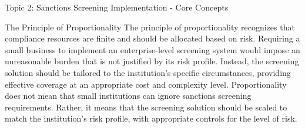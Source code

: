 \documentclass[5pt]{beamer}
\begin{document}
\begin{frame}{Topic 2: Sanctions Screening Implementation - Core Concepts}
\begin{block}{\tiny The Principle of Proportionality}
			The principle of proportionality recognizes that compliance resources are finite and should be allocated based on risk. Requiring a small business to implement an enterprise-level screening system would impose an unreasonable burden that is not justified by its risk profile. Instead, the screening solution should be tailored to the institution's specific circumstances, providing effective coverage at an appropriate cost and complexity level. Proportionality does not mean that small institutions can ignore sanctions screening requirements. Rather, it means that the screening solution should be scaled to match the institution's risk profile, with appropriate controls for the level of risk.
		\end{block}
	\end{frame}
	
\end{document}
